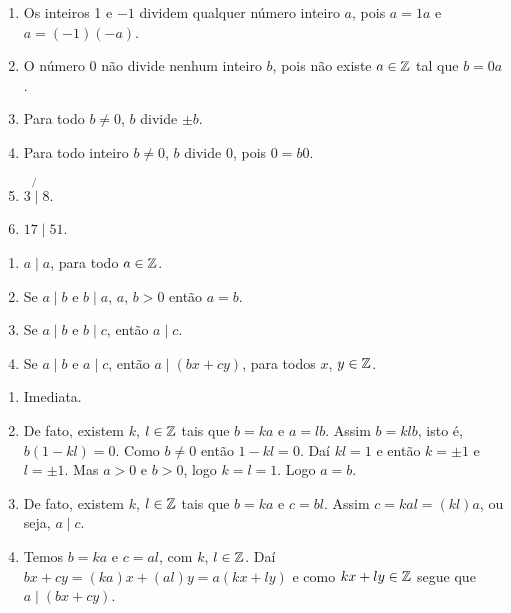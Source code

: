 \begin{exemplos}
	\begin{enumerate}[label={\arabic*})]
		\item Os inteiros 1 e $-1$ dividem qualquer n{\'u}mero inteiro $a$, pois $a = 1 a$ e $a = (-1)(-a)$.
		\item O n{\'u}mero 0 n{\~a}o divide nenhum inteiro $b$, pois n{\~a}o existe $a \in \mathbb{Z}$ tal que $b = 0a$.
		\item Para todo $b\neq 0$, $b$ divide $\pm b$.
		\item Para todo inteiro $b\neq 0$, $b$ divide 0, pois $0 = b0$.
		\item $3 \not{\mid} 8$.
		\item $17 \mid 51$.
	\end{enumerate}	
\end{exemplos}


\begin{proposicao}
	\begin{enumerate}[label={\roman*})]
		\item $a\mid a$, para todo $a \in \mathbb{Z}$.
		\item Se $a\mid b$ e $b\mid a$, $a$, $b > 0$ então $a = b$.
		\item Se $a\mid b$ e $b\mid c$, ent{\~a}o $a\mid c$.
		\item Se $a\mid b$ e $a\mid c$, ent{\~a}o $a\mid (bx+cy)$, para todos $x$, $y \in \mathbb{Z}$.
	\end{enumerate}
\end{proposicao}
\begin{prova}
	\begin{enumerate}[label={\roman*})]
		\item Imediata.
		
		\item De fato, existem $k$, $l \in \mathbb{Z} $ tais que $b = ka$ e $a = lb$. Assim $b = klb$, isto é, $b(1 - kl) = 0$.
		Como $b \ne 0$ então $1 - kl = 0$. Daí $kl = 1$ e então $k = \pm 1$ e $l = \pm 1$. Mas $a > 0$ e $b > 0$, logo $k = l =1$. Logo $a = b$.

		\item De fato, existem $k$, $l \in \mathbb{Z}$ tais que $b = ka$ e $c = bl$. Assim  $c = kal = (kl)a$, ou seja, $a\mid c$.

		\item Temos $b = ka$ e $c = al$, com $k$, $l \in \mathbb{Z}$. Daí $bx + cy = (ka)x + (al)y = a(kx + ly)$ e como $kx + ly \in \mathbb{Z}$ segue que $a \mid (bx + cy)$.
	\end{enumerate}
\end{prova}

